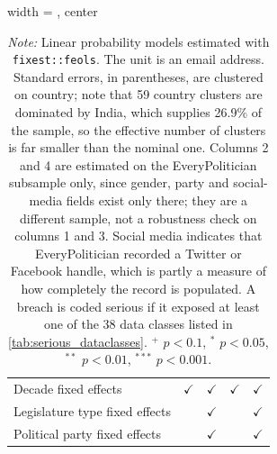 \begin{table}[!htbp]
\begin{adjustbox}{width = \textwidth, center}
\begin{tabular}{lcccc}
      Decade fixed effects           & $\checkmark$  & $\checkmark$  & $\checkmark$  & $\checkmark$\\   
      Legislature type fixed effects &               & $\checkmark$  &               & $\checkmark$\\   
      Political party fixed effects  &               & $\checkmark$  &               & $\checkmark$\\   
      \bottomrule
   \end{tabular}
\end{adjustbox}
\par\endgroup
\caption*{\scriptsize \emph{Note:}
Linear probability models estimated with \texttt{fixest::feols}. The unit is
an email address. Standard errors, in parentheses, are clustered on country;
note that 59 country clusters are dominated by India, which supplies 26.9\% of
the sample, so the effective number of clusters is far smaller than the nominal
one. Columns 2 and 4 are estimated on the EveryPolitician subsample only, since
gender, party and social-media fields exist only there; they are a different
sample, not a robustness check on columns 1 and 3. Social media indicates that
EveryPolitician recorded a Twitter or Facebook handle, which is partly a measure
of how completely the record is populated.
A breach is coded serious if it exposed at least one of the 38 data classes listed in \cref{tab:serious_dataclasses}.
$^{+}$ $p<0.1$, $^{*}$ $p<0.05$, $^{**}$ $p<0.01$, $^{***}$ $p<0.001$.
}
\end{table}
